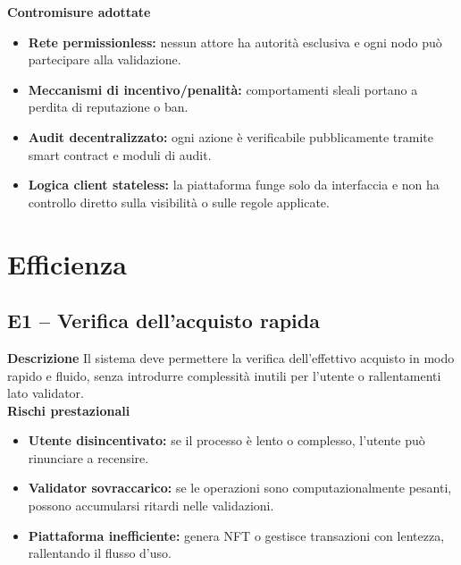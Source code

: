             \noindent \textbf{Contromisure adottate}
                \begin{itemize}
                    \item \textbf{Rete permissionless:} nessun attore ha autorità esclusiva e ogni nodo può partecipare alla validazione.

                    \item \textbf{Meccanismi di incentivo/penalità:} comportamenti sleali portano a perdita di reputazione o ban.

                    \item \textbf{Audit decentralizzato:} ogni azione è verificabile pubblicamente tramite smart contract e moduli di audit.

                    \item \textbf{Logica client stateless:} la piattaforma funge solo da interfaccia e non ha controllo diretto sulla visibilità o sulle regole applicate.
                \end{itemize}

    \section{Efficienza}
        \subsection{E1 – Verifica dell'acquisto rapida}
            \noindent \textbf{Descrizione}
                Il sistema deve permettere la verifica dell'effettivo acquisto in modo rapido e fluido, senza introdurre complessità inutili per l'utente o rallentamenti lato validator. \\

            \noindent \textbf{Rischi prestazionali}
                \begin{itemize}
                    \item \textbf{Utente disincentivato:} se il processo è lento o complesso, l'utente può rinunciare a recensire.

                    \item \textbf{Validator sovraccarico:} se le operazioni sono computazionalmente pesanti, possono accumularsi ritardi nelle validazioni.

                    \item \textbf{Piattaforma inefficiente:} genera NFT o gestisce transazioni con lentezza, rallentando il flusso d'uso.
                \end{itemize}

